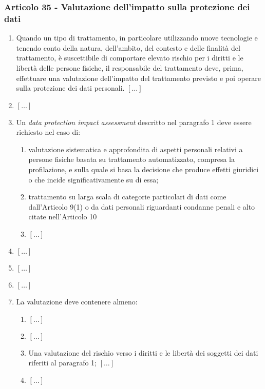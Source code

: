         \subsubsection{Articolo 35 - Valutazione dell'impatto sulla protezione dei dati}
            \begin{enumerate}
                \item Quando un tipo di trattamento, in particolare utilizzando nuove tecnologie e tenendo conto della natura, dell'ambito, del contesto e delle finalità del trattamento, è suscettibile di comportare
                elevato rischio per i diritti e le libertà delle persone fisiche, il responsabile del trattamento deve, prima, effettuare una valutazione dell'impatto del trattamento previsto e poi operare sulla protezione dei dati personali. $[\dots]$
                \item $[\dots]$
                \item Un \textit{data protection impact assessment} descritto nel paragrafo 1 deve essere richiesto nel caso di:
                    \begin{enumerate}
                        \item valutazione sistematica e approfondita di aspetti personali relativi a persone fisiche basata su trattamento automatizzato, compresa la profilazione, e sulla quale si basa la decisione che produce effetti giuridici o che incide significativamente su di essa;
                        \item trattamento su larga scala di categorie particolari di dati come dall'Articolo 9(1) o da dati personali riguardanti condanne penali e alto citate nell'Articolo 10
                        \item $[\dots]$
                    \end{enumerate}
                \item $[\dots]$
                \item $[\dots]$
                \item $[\dots]$
                \item La valutazione deve contenere almeno:
                    \begin{enumerate}
                        \item $[\dots]$
                        \item $[\dots]$
                        \item Una valutazione del rischio verso i diritti e le libertà dei soggetti dei dati riferiti al paragrafo 1; $[\dots]$
                        \item $[\dots]$
                    \end{enumerate}
            \end{enumerate}
